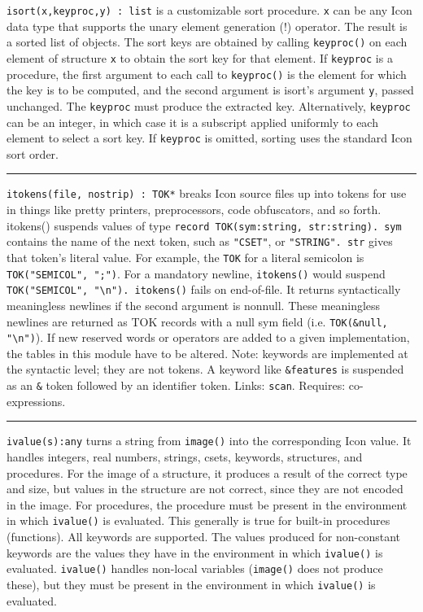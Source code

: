 \texttt{i}\texttt{sort}\texttt{(x,keyproc,y) : list} is a
customizable sort procedure. \texttt{x} can be any Icon data type that
supports the unary element generation (!) operator. The result is a
sorted list of objects. The sort keys are obtained by calling
\texttt{keyproc()} on each element of structure \texttt{x} to obtain the sort
key for that element. If
\texttt{keyproc} is a procedure, the first argument to each call to
\texttt{keyproc()} is the element for which the key is to be computed,
and the second argument is isort's argument
\texttt{y}, passed unchanged. The \texttt{keyproc} must produce the
extracted key. Alternatively, \texttt{keyproc} can be an integer, in
which case it is a subscript applied uniformly to each element to select
a sort key. If \texttt{keyproc} is omitted, sorting uses
the standard Icon sort order.

\vspace{0.25cm}\hrule{}

\texttt{itokens(file, nostrip) : TOK*} breaks Icon source files up into
tokens for use in things like pretty printers, preprocessors, code
obfuscators, and so forth. itokens() suspends values of type
\texttt{record TOK(sym:string, str:string). sym} contains the name of
the next token, such as \texttt{"CSET"}, or
\texttt{"STRING". str} gives that
token's literal value. For example, the \texttt{TOK}
for a literal semicolon is
\texttt{TOK("SEMICOL",
";")}. For a mandatory newline,
\texttt{itokens()} would suspend
\texttt{TOK("SEMICOL",
"{\textbackslash}n"). itokens()} fails on
end-of-file. It returns syntactically meaningless newlines if the
second argument is nonnull. These meaningless newlines are returned as
TOK records with a null sym field (i.e. \texttt{TOK(\&null,
"{\textbackslash}n")}). If new reserved
words or operators are added to a given implementation, the tables in
this module have to be altered. Note: keywords are implemented at the
syntactic level; they are not tokens. A keyword like
\texttt{\&features} is suspended as an \texttt{\&} token followed by an
identifier token.
Links: \texttt{scan}. Requires: co-expressions.

\vspace{0.25cm}\hrule{}

\texttt{ivalue(s):any} turns a string from \texttt{image()} into the
corresponding Icon value. It handles integers, real numbers,
strings, csets, keywords, structures, and procedures. For the image of
a structure, it produces a result of the correct type and size, but
values in the structure are not correct, since they are not encoded in
the image. For procedures, the procedure must be present in the
environment in which \texttt{ivalue()} is evaluated. This generally is
true for built-in procedures (functions). All keywords are supported.
The values produced for non-constant keywords are the
values they have in the environment in which \texttt{ivalue()} is
evaluated. \texttt{ivalue()} handles non-local variables
(\texttt{image()} does not produce these), but they must be present in
the environment in which \texttt{ivalue()} is evaluated. 

